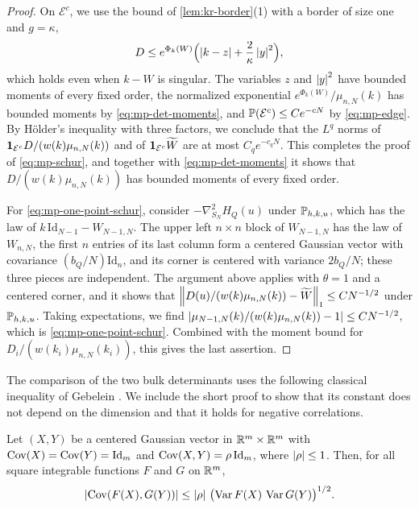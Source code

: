 \begin{proof}
On $\mathcal E^c$, we use the bound of \cref{lem:kr-border}(1) with a border of size one and $g=\kappa$,
\begin{equation}\label{eq:mp-cofactor}
D\le e^{\Phi_k(W)}\Bigl(\left|k-z\right|+\frac2\kappa\left|y\right|^2\Bigr),
\end{equation}
which holds even when $k-W$ is singular. The variables $z$ and $\left|y\right|^2$ have bounded moments of every fixed order, the normalized exponential $e^{\Phi_k(W)}/\mu_{n,N}(k)$ has bounded moments by \eqref{eq:mp-det-moments}, and $\mathbb P(\mathcal E^c)\le Ce^{-cN}$ by \eqref{eq:mp-edge}. By H\"older's inequality with three factors, we conclude that the $L^q$ norms of $\mathbf 1_{\mathcal E^c}D/(w(k)\mu_{n,N}(k))$ and of $\mathbf 1_{\mathcal E^c}\widetilde W$ are at most $C_qe^{-c_qN}$. This completes the proof of \eqref{eq:mp-schur}, and together with \eqref{eq:mp-det-moments} it shows that $D/(w(k)\mu_{n,N}(k))$ has bounded moments of every fixed order.

For \eqref{eq:mp-one-point-schur}, consider $-\nabla^2_{S_N}H_Q(u)$ under $\mathbb P_{h,k,u}$, which has the law of $k\,\mathrm{Id}_{N-1}-W_{N-1,N}$. The upper left $n\times n$ block of $W_{N-1,N}$ has the law of $W_{n,N}$, the first $n$ entries of its last column form a centered Gaussian vector with covariance $(b_Q/N)\mathrm{Id}_n$, and its corner is centered with variance $2b_Q/N$; these three pieces are independent. The argument above applies with $\theta=1$ and a centered corner, and it shows that $\left\lVert D(u)/(w(k)\mu_{n,N}(k))-\widetilde W\right\rVert_1\le CN^{-1/2}$ under $\mathbb P_{h,k,u}$. Taking expectations, we find $\left|\mu_{N-1,N}(k)/(w(k)\mu_{n,N}(k))-1\right|\le CN^{-1/2}$, which is \eqref{eq:mp-one-point-schur}. Combined with the moment bound for $D_i/(w(k_i)\mu_{n,N}(k_i))$, this gives the last assertion.
\end{proof}

The comparison of the two bulk determinants uses the following classical inequality of Gebelein \cite{Gebelein1941}. We include the short proof to show that its constant does not depend on the dimension and that it holds for negative correlations.

\begin{lemma}\label{lem:mp-gebelein}
Let $(X,Y)$ be a centered Gaussian vector in $\mathbb R^m\times\mathbb R^m$ with $\operatorname{Cov}(X)=\operatorname{Cov}(Y)=\mathrm{Id}_m$ and $\operatorname{Cov}(X,Y)=\rho\,\mathrm{Id}_m$, where $\left|\rho\right|\le1$. Then, for all square integrable functions $F$ and $G$ on $\mathbb R^m$,
\begin{equation}\label{eq:mp-gebelein}
\left|\operatorname{Cov}(F(X),G(Y))\right|\le\left|\rho\right|\,\bigl(\operatorname{Var} F(X)\,\operatorname{Var} G(Y)\bigr)^{1/2}.
\end{equation}
\end{lemma}

